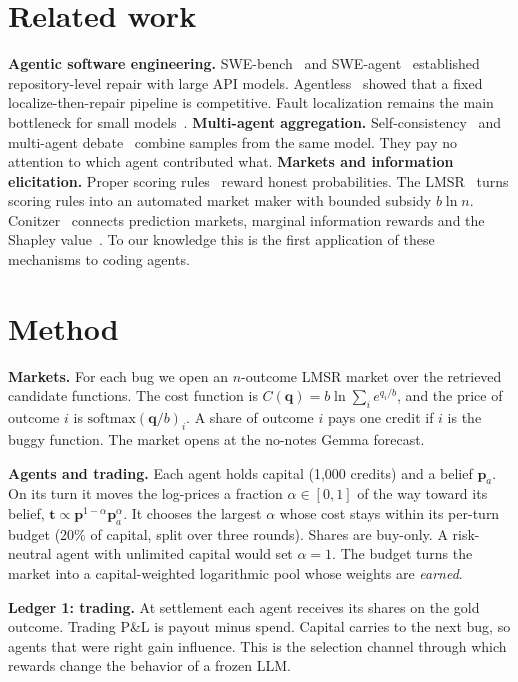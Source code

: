 \documentclass[10pt]{article}
\begin{document}
\section{Related work}
\textbf{Agentic software engineering.} SWE-bench~\cite{swebench} and SWE-agent~\cite{sweagent} established repository-level repair with large API models. Agentless~\cite{agentless} showed that a fixed localize-then-repair pipeline is competitive. Fault localization remains the main bottleneck for small models~\cite{marketbugs}.
\textbf{Multi-agent aggregation.} Self-consistency~\cite{selfconsistency} and multi-agent debate~\cite{debate} combine samples from the same model. They pay no attention to which agent contributed what.
\textbf{Markets and information elicitation.} Proper scoring rules~\cite{gneiting} reward honest probabilities. The LMSR~\cite{hanson2003} turns scoring rules into an automated market maker with bounded subsidy $b\ln n$. Conitzer~\cite{conitzer2009} connects prediction markets, marginal information rewards and the Shapley value~\cite{shapley}. To our knowledge this is the first application of these mechanisms to coding agents.

\section{Method}\label{sec:method}
\textbf{Markets.} For each bug we open an $n$-outcome LMSR market over the retrieved candidate functions. The cost function is $C(\mathbf{q}) = b \ln \sum_i e^{q_i/b}$, and the price of outcome $i$ is $\mathrm{softmax}(\mathbf{q}/b)_i$. A share of outcome $i$ pays one credit if $i$ is the buggy function. The market opens at the no-notes Gemma forecast.

\textbf{Agents and trading.} Each agent holds capital (1{,}000 credits) and a belief $\mathbf{p}_a$. On its turn it moves the log-prices a fraction $\alpha\in[0,1]$ of the way toward its belief, $\mathbf{t}\propto \mathbf{p}^{1-\alpha}\mathbf{p}_a^{\alpha}$. It chooses the largest $\alpha$ whose cost stays within its per-turn budget (20\% of capital, split over three rounds). Shares are buy-only. A risk-neutral agent with unlimited capital would set $\alpha=1$. The budget turns the market into a capital-weighted logarithmic pool whose weights are \emph{earned}.

\textbf{Ledger 1: trading.} At settlement each agent receives its shares on the gold outcome. Trading P\&L is payout minus spend. Capital carries to the next bug, so agents that were right gain influence. This is the selection channel through which rewards change the behavior of a frozen LLM.
\end{document}
